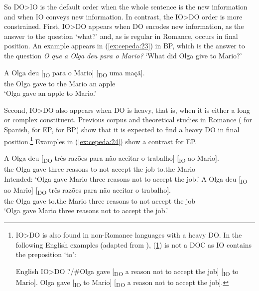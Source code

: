 \documentclass[output=paper,colorlinks,citecolor=brown,nonflat]{./langscibook}
\begin{document}
So DO>IO is the default order when the whole sentence is the new information and when IO conveys new information. In contrast, the IO>DO order is more constrained. First, IO>DO appears when DO encodes new information, as the answer to the question ‘what?’ and, as is regular in Romance, occurs in final position. An example appears in (\ref{ex:cepeda:23}) in BP, which is the answer to the question \textit{O que a Olga deu para o Mario?} ‘What did Olga give to Mario?’

\ea%
    \label{ex:cepeda:23}
	\gll A   Olga deu [\textsubscript{IO} para o   Mario] [\textsubscript{DO} uma maçã].\\
		the Olga gave \hspaceThis{[\textsubscript{IO}} to the Mario  \hspaceThis{[\textsubscript{DO}} an apple\\
	\glt ‘Olga gave an apple to Mario.’
\z

Second, IO>DO also appears when DO is heavy, that is, when it is either a long or complex constituent. Previous corpus and theoretical studies in Romance (\citealt{BeaversNishida2010} for Spanish, \citealt{Brito2014} for EP, \citealt{Mioto2003} for BP) show that it is expected to find a heavy DO in final position.\footnote{IO>DO is also found in non-Romance languages with a heavy DO. In the following English examples (adapted from \citealt{Larson2014}), (\ref{ex:cepeda:ib}) is not a DOC as IO contains the preposition ‘to’:

\ea%
    \label{ex:cepeda:i}
    English IO>DO
	\ea\label{ex:cepeda:ia} {?/\#}Olga gave [\textsubscript{DO} a reason not to accept the job] [\textsubscript{IO} to Mario].
	\ex\label{ex:cepeda:ib} Olga gave [\textsubscript{IO} to Mario] [\textsubscript{DO} a reason not to accept the job].
	\z
\z
} Examples in (\ref{ex:cepeda:24}) show a contrast for EP.

\ea%
    \label{ex:cepeda:24}
	\ea\label{ex:cepeda:24a}
	A Olga deu [\textsubscript{DO}  três razões para não aceitar o trabalho] [\textsubscript{IO} ao Mario].\\
		the Olga gave \hspaceThis{[\textsubscript{DO}} three reasons to not accept the job \hspaceThis{[\textsubscript{IO}} to.the Mario\\
	\glt Intended: ‘Olga gave Mario three reasons not to accept the job.’
	\ex\label{ex:cepeda:24b}
	\gll A Olga deu [\textsubscript{IO} ao Mario] [\textsubscript{DO} três razões para não aceitar o trabalho].\\
		the Olga gave \hspaceThis{[\textsubscript{IO}} to.the Mario \hspaceThis{[\textsubscript{DO}} three reasons to not accept the job\\
	\glt ‘Olga gave Mario three reasons not to accept the job.’
	\z
\z
\end{document}
